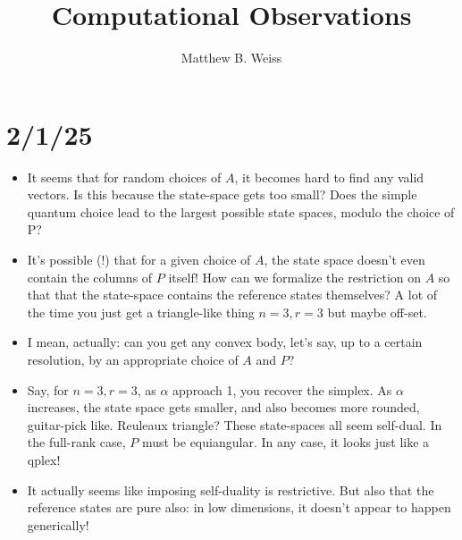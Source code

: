 \documentclass[11pt]{article}
\title{Computational Observations}
\author{Matthew B. Weiss}
\begin{document}
\maketitle

\section{2/1/25}
\begin{itemize}
\item It seems that for random choices of $A$, it becomes hard to find any valid vectors. Is this because the state-space gets too small? Does the simple quantum choice lead to the largest possible state spaces, modulo the choice of P?
\item It's possible (!) that for a given choice of $A$, the state space doesn't even contain the columns of $P$ itself! How can we formalize the restriction on $A$ so that that the state-space contains the reference states themselves? A lot of the time you just get a triangle-like thing $n=3, r=3$ but maybe off-set.
\item I mean, actually: can you get any convex body, let's say, up to a certain resolution, by an appropriate choice of $A$ and $P$?
\item Say, for $n=3, r=3$, as $\alpha$ approach 1, you recover the simplex. As $\alpha$ increases, the state space gets smaller, and also becomes more rounded, guitar-pick like. Reuleaux triangle? These state-spaces all seem self-dual. In the full-rank case, $P$ must be equiangular. In any case, it looks just like a qplex!
\item It actually seems like imposing self-duality is restrictive. But also that the reference states are pure also: in low dimensions, it doesn't appear to happen generically!
\end{itemize}
\end{document}
